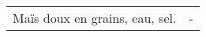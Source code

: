 \begin{tabular}{p{7cm}p{7cm}}
                                                                                                                                                                                                                                                                                                                                                                                                                                                                                                                                                                                                                                                                                                                                                                                                                                                                                                                                                                                                                                                                                                                                                                                                                                                                                                                                                                                                                                                                                                                                                                                                                                                                                      Maïs doux en grains, eau, sel. &                                                                                                                                                                                                                                                                                                                                                                                                                                                                                                                                                            - \\

\end{tabular}
